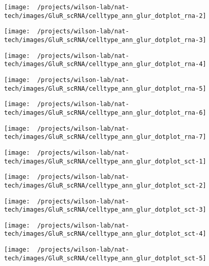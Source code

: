 \documentclass[
]{article}
\begin{document}
\begin{center}\texttt{[image: ~/projects/wilson-lab/nat-tech/images/GluR\_scRNA/celltype\_ann\_glur\_dotplot\_rna-2]} \end{center}

\begin{center}\texttt{[image: ~/projects/wilson-lab/nat-tech/images/GluR\_scRNA/celltype\_ann\_glur\_dotplot\_rna-3]} \end{center}

\begin{center}\texttt{[image: ~/projects/wilson-lab/nat-tech/images/GluR\_scRNA/celltype\_ann\_glur\_dotplot\_rna-4]} \end{center}

\begin{center}\texttt{[image: ~/projects/wilson-lab/nat-tech/images/GluR\_scRNA/celltype\_ann\_glur\_dotplot\_rna-5]} \end{center}

\begin{center}\texttt{[image: ~/projects/wilson-lab/nat-tech/images/GluR\_scRNA/celltype\_ann\_glur\_dotplot\_rna-6]} \end{center}

\begin{center}\texttt{[image: ~/projects/wilson-lab/nat-tech/images/GluR\_scRNA/celltype\_ann\_glur\_dotplot\_rna-7]} \end{center}

\begin{center}\texttt{[image: ~/projects/wilson-lab/nat-tech/images/GluR\_scRNA/celltype\_ann\_glur\_dotplot\_sct-1]} \end{center}

\begin{center}\texttt{[image: ~/projects/wilson-lab/nat-tech/images/GluR\_scRNA/celltype\_ann\_glur\_dotplot\_sct-2]} \end{center}

\begin{center}\texttt{[image: ~/projects/wilson-lab/nat-tech/images/GluR\_scRNA/celltype\_ann\_glur\_dotplot\_sct-3]} \end{center}

\begin{center}\texttt{[image: ~/projects/wilson-lab/nat-tech/images/GluR\_scRNA/celltype\_ann\_glur\_dotplot\_sct-4]} \end{center}

\begin{center}\texttt{[image: ~/projects/wilson-lab/nat-tech/images/GluR\_scRNA/celltype\_ann\_glur\_dotplot\_sct-5]} \end{center}
\end{document}
